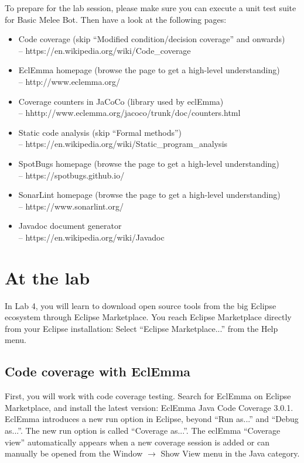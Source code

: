 \documentclass{scrreprt}
\begin{document}
To prepare for the lab session, please make sure you can execute a unit test suite for Basic Melee Bot. Then have a look at the following pages:
\begin{itemize}
\item Code coverage (skip ``Modified condition/decision coverage'' and onwards)\\-- https://en.wikipedia.org/wiki/Code_coverage
\item EclEmma homepage (browse the page to get a high-level understanding) \\-- http://www.eclemma.org/
\item Coverage counters in JaCoCo (library used by eclEmma) \\-- hhttp://www.eclemma.org/jacoco/trunk/doc/counters.html
\item Static code analysis (skip ``Formal methods'') \\-- https://en.wikipedia.org/wiki/Static_program_analysis
\item SpotBugs homepage (browse the page to get a high-level understanding) \\-- https://spotbugs.github.io/
\item SonarLint homepage (browse the page to get a high-level understanding) \\-- https://www.sonarlint.org/
\item Javadoc document generator \\-- https://en.wikipedia.org/wiki/Javadoc
\end{itemize}

\chapter{At the lab} \label{sec:atlab}
In Lab 4, you will learn to download open source tools from the big Eclipse ecosystem through Eclipse Marketplace. You reach Eclipse Marketplace directly from your Eclipse installation: Select ``Eclipse Marketplace...'' from the Help menu.

\section{Code coverage with EclEmma}
First, you will work with code coverage testing. Search for EclEmma on Eclipse Marketplace, and install the latest version: EclEmma Java Code Coverage 3.0.1. EclEmma introduces a new run option in Eclipse, beyond ``Run as...'' and ``Debug as...''. The new run option is called ``Coverage as...''. The eclEmma ``Coverage view'' automatically appears when a new coverage session is added or can manually be opened from the Window $\rightarrow$ Show View menu in the Java category. 
\end{document}
